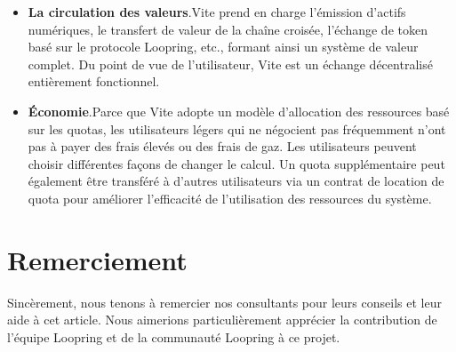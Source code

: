 \documentclass[UTF8,nofonts]{article}
\begin{document}
\begin{multicols}{2}
\begin{itemize}
	\item \textbf{La circulation des valeurs}.Vite prend en charge l'émission d'actifs numériques, le transfert de valeur de la chaîne croisée, l'échange de token basé sur le protocole Loopring, etc., formant ainsi un système de valeur complet. Du point de vue de l'utilisateur, Vite est un échange décentralisé entièrement fonctionnel.
	\item \textbf{Économie}.Parce que Vite adopte un modèle d'allocation des ressources basé sur les quotas, les utilisateurs légers qui ne négocient pas fréquemment n'ont pas à payer des frais élevés ou des frais de gaz. Les utilisateurs peuvent choisir différentes façons de changer le calcul. Un quota supplémentaire peut également être transféré à d'autres utilisateurs via un contrat de location de quota pour améliorer l'efficacité de l'utilisation des ressources du système.
\end{itemize}
\section{Remerciement}
Sincèrement, nous tenons à remercier nos consultants pour leurs conseils et leur aide à cet article. Nous aimerions particulièrement apprécier la contribution de l'équipe Loopring et de la communauté Loopring à ce projet. 

\end{multicols}



\end{document}
